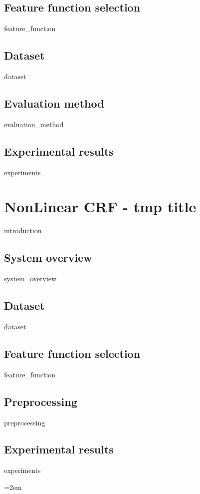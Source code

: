 \documentclass[12pt]{report}
\begin{document}
\section{Feature function selection}	
{feature_function}

\section{Dataset}	
\label{sec:linear_dataset}
{dataset}

\section{Evaluation method}	
{evaluation_method}

\section{Experimental results}	
{experiments}

\chapter{NonLinear CRF - tmp title}
\label{chapter:nonlinear}
{introduction}

\section{System overview}	
{system_overview}

\section{Dataset}	
{dataset}

\section{Feature function selection}	
{feature_function}

\section{Preprocessing}	
{preprocessing}

\section{Experimental results}	
{experiments}

\newpage
\emergencystretch=2em
\printbibliography 
\end{document}
